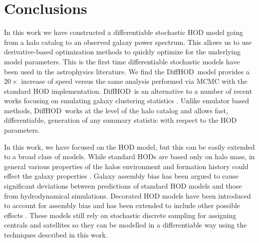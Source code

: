 \documentclass[a4paper,usenatbib]{mnras}
\newcommand{\dhod}{{\sc DiffHOD}}
\begin{document}
\section{Conclusions}
\label{sec:conclusion}
In this work we have constructed a differentiable stochastic HOD model going from a halo catalog to an observed galaxy power spectrum.
This allows us to use derivative-based optimization methods to quickly optimize for the underlying model parameters. 
This is the first time differentiable stochastic models have been used in the astrophysics literature. 
We find the \dhod~model provides a 
$20\times$ increase of speed versus the same analysis performed via MCMC with the standard HOD implementation.
\dhod~is an alternative to a number of recent works focusing on emulating galaxy clustering statistics \citep{2015ApJ...810...35K,2019MNRAS.484..989W,2020PhRvD.102f3504K,2020MNRAS.492.2872W}. 
Unlike emulator based methods, \dhod~works at the level of the halo catalog and allows fast, differentiable, generation of any summary statistic with respect to the HOD parameters.

In this work, we have focused on the \citet{2007zheng} HOD model, but this can be easily extended to a broad class of models. While standard HODs are based only on halo mass, in general various properties of the halos environment and formation history could effect the galaxy properties \citep{2006ApJ...639L...5Z,2007MNRAS.374.1303C}. Galaxy assembly bias has been argued \citep{2015MNRAS.446.1939F,2020MNRAS.493.5506H} to cause significant deviations between predictions of standard HOD models and those from hydrodynamical simulations. Decorated HOD models have been introduced to account for assembly bias \citep{2016MNRAS.460.2552H} and has been extended to include other possible effects \citep{2018MNRAS.478.2019Y}. These models still rely on stochastic discrete sampling for assigning centrals and satellites so they can be modelled in a differentiable way using the techniques described in this work.
\end{document}
